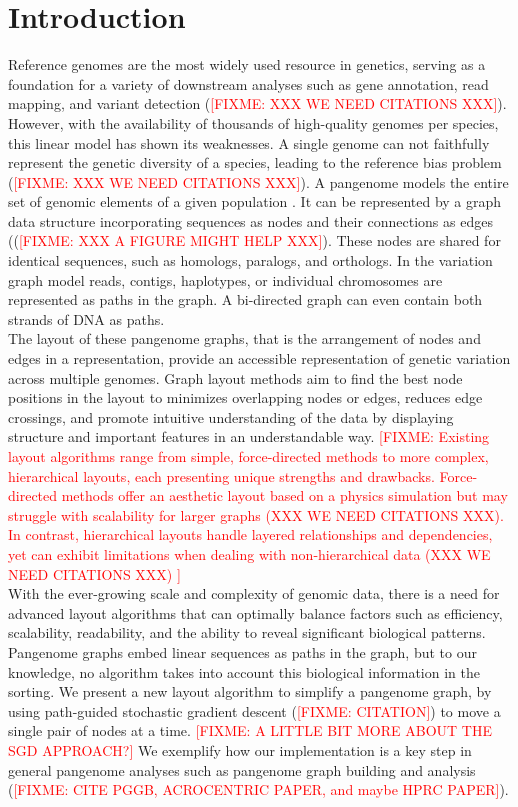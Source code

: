 \documentclass{bioinfo}
\theoremstyle{definition}
\newcommand{\red}[1]{{\textcolor{Red}{#1}}}
\newcommand{\FIXME}[1]{\red{[FIXME: #1]}}
\begin{document}
    \section{Introduction}
    Reference genomes are the most widely used resource in genetics, serving as a foundation for a variety of downstream analyses
    such as gene annotation, read mapping, and variant detection (\FIXME{XXX WE NEED CITATIONS XXX}).
    However, with the availability of thousands of high-quality genomes per species, this linear model has shown its weaknesses.
    A single genome can not faithfully represent the genetic diversity of a species, leading to the reference bias problem (\FIXME{XXX WE NEED CITATIONS XXX}).
    A pangenome models the entire set of genomic elements of a given population \citep{Tettelin_2008,cpang2018,Eizenga_2020}.
    It can be represented by a graph data structure incorporating sequences as nodes and their connections as edges ((\FIXME{XXX A FIGURE MIGHT HELP XXX}).
    These nodes are shared for identical sequences, such as homologs, paralogs, and orthologs.
    In the variation graph model \citep{Garrison:2018} reads, contigs, haplotypes, or individual chromosomes are represented as paths in the graph.
    A bi-directed graph can even contain both strands of DNA as paths. \\
    The layout of these pangenome graphs, that is the arrangement of nodes and edges in a representation, provide an accessible representation of genetic variation across multiple genomes.
    Graph layout methods aim to find the best node positions in the layout to minimizes overlapping nodes or edges, reduces edge crossings, and promote intuitive understanding of the data by displaying structure and important features in an understandable way.
    \FIXME{
        Existing layout algorithms range from simple, force-directed methods to more complex, hierarchical layouts, each presenting unique strengths and drawbacks.
        Force-directed methods offer an aesthetic layout based on a physics simulation but may struggle with scalability for larger graphs (XXX WE NEED CITATIONS XXX).
        In contrast, hierarchical layouts handle layered relationships and dependencies, yet can exhibit limitations when dealing with non-hierarchical data (XXX WE NEED CITATIONS XXX)
    } \\
    With the ever-growing scale and complexity of genomic data, there is a need for advanced layout algorithms that can optimally balance factors such as
    efficiency, scalability, readability, and the ability to reveal significant biological patterns.
    Pangenome graphs embed linear sequences as paths in the graph, but to our knowledge, no algorithm takes into account this biological information in the sorting.
    We present a new layout algorithm to simplify a pangenome graph, by using path-guided stochastic gradient descent (\FIXME{CITATION}) to move a single pair of nodes at a time.
    \FIXME{A LITTLE BIT MORE ABOUT THE SGD APPROACH?}
    We exemplify how our implementation is a key step in general pangenome analyses such as pangenome graph building and analysis (\FIXME{CITE PGGB, ACROCENTRIC PAPER, and maybe HPRC PAPER}).
\end{document}
